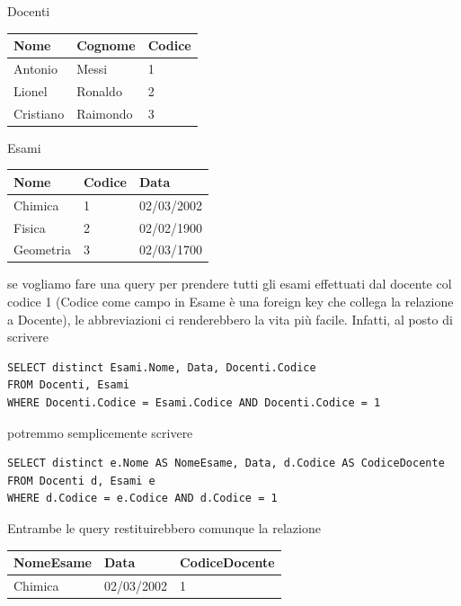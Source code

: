 \documentclass[11pt, a4paper, titlepage, oneside]{scrbook}
\begin{document}
\begin{minipage}[c]{0.45\textwidth}
\begin{center}
    Docenti

\begin{tabular}{|l|l|l|}
\hline
\textbf{Nome} & \textbf{Cognome} & \textbf{Codice} \\ \hline
Antonio & Messi & 1 \\
Lionel & Ronaldo & 2 \\
Cristiano & Raimondo & 3 \\ \hline
\end{tabular}
\end{center}
\end{minipage}\hfill
\begin{minipage}[c]{0.45\textwidth}
\begin{center}
    Esami

\begin{tabular}{|l|l|l|}
\hline
\textbf{Nome} & \textbf{Codice} & \textbf{Data} \\ \hline
Chimica & 1 & 02/03/2002 \\
Fisica & 2 & 02/02/1900 \\
Geometria & 3 & 02/03/1700 \\ \hline
\end{tabular}
\end{center}
\end{minipage}

se vogliamo fare una query per prendere tutti gli esami effettuati dal docente col codice 1 (Codice come campo in Esame è una foreign key che collega la relazione a Docente), le abbreviazioni ci renderebbero la vita più facile. Infatti, al posto di scrivere

\begin{lstlisting}
SELECT distinct Esami.Nome, Data, Docenti.Codice
FROM Docenti, Esami
WHERE Docenti.Codice = Esami.Codice AND Docenti.Codice = 1
\end{lstlisting}

potremmo semplicemente scrivere

\begin{lstlisting}
SELECT distinct e.Nome AS NomeEsame, Data, d.Codice AS CodiceDocente
FROM Docenti d, Esami e
WHERE d.Codice = e.Codice AND d.Codice = 1
\end{lstlisting}

Entrambe le query restituirebbero comunque la relazione

\begin{center}
\begin{tabular}{|l|l|l|}
\hline
\textbf{NomeEsame} & \textbf{Data} & \textbf{CodiceDocente} \\ \hline
Chimica & 02/03/2002 & 1 \\ \hline
\end{tabular}
\end{center}
\end{document}
